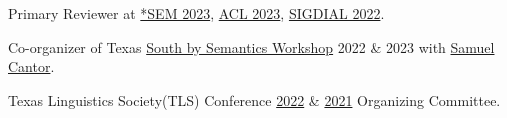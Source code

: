 Primary Reviewer at \href{https://sites.google.com/view/starsem2023/home?authuser=0}{*SEM 2023}, \href{https://2023.aclweb.org}{ACL 2023}, \href{https://2022.sigdial.org}{SIGDIAL 2022}.

Co-organizer of Texas \href{https://sites.google.com/utexas.edu/sxsw}{South by Semantics Workshop} 2022 \& 2023 with \href{https://www.cantwolf.com}{Samuel Cantor}.

Texas Linguistics Society(TLS) Conference \href{http://tls.ling.utexas.edu/2022/}{2022} \& \href{http://tls.ling.utexas.edu/2021/}{2021} Organizing Committee.
